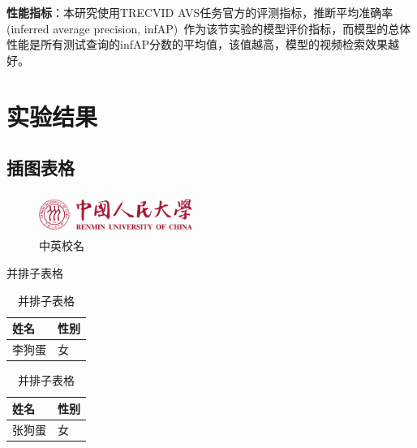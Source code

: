 \textbf{性能指标}：本研究使用TRECVID AVS任务官方的评测指标，推断平均准确率(inferred average precision, infAP)~\cite{}作为该节实验的模型评价指标，而模型的总体性能是所有测试查询的infAP分数的平均值，该值越高，模型的视频检索效果越好。







\section{实验结果}
\subsection{插图表格}
\begin{figure}[htbp]
\centering\includegraphics[width=5cm,height=1.32cm]{figures/logo3.pdf}
\caption[中英校名]{中英校名}
\end{figure}
\begin{table}[htbp]
\noindent\begin{minipage}{0.5\textwidth}
\centering
\caption{并排子表格}
\label{tab:parallel1}
\begin{tabular}{p{2cm}p{2cm}}
\toprule[1.5pt]
姓名 & 性别 \\\midrule[1pt]
李狗蛋 & 女 \\\bottomrule[1.5pt]
\end{tabular}
\end{minipage}
\begin{minipage}{0.5\textwidth}
\centering
\caption{并排子表格}
\label{tab:parallel2}
\begin{tabular}{p{2cm}p{2cm}}
\toprule[1.5pt]
姓名 & 性别 \\\midrule[1pt]
张狗蛋 & 女 \\\bottomrule[1.5pt]
\end{tabular}
\end{minipage}
\end{table}
\begin{table}[htbp]
\centering
\caption{并排子表格}
\label{tab:subtable}
\hskip2cm
\end{table}

